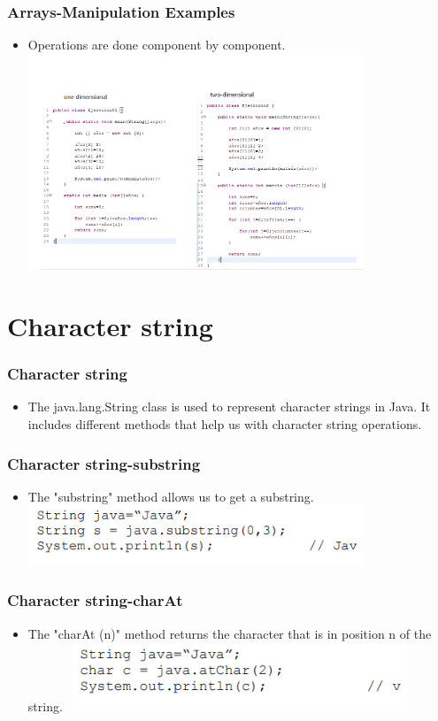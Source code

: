 \documentclass[11pt]{beamer}
\begin{document}
\begin{frame}
\frametitle{Arrays-Manipulation Examples}
\begin{itemize}
\item Operations are done component by component.
{\includegraphics[width=10.0cm]{img/Examples.png}}
\end{itemize}
\end{frame}

\section{Character string}

\begin{frame}
\frametitle{Character string}
\begin{itemize}
\item The java.lang.String class is used to represent character strings in Java. It includes different methods that help us with character string operations.

\end{itemize}
\end{frame}

\begin{frame}
\frametitle{Character string-substring}
\begin{itemize}
\item The "substring" method allows us to get a substring.
\
{\includegraphics[width=10.0cm]{img/a1.png}}
\end{itemize}
\end{frame}

\begin{frame}
\frametitle{Character string-charAt}
\begin{itemize}
\item The "charAt (n)" method returns the character that is in position n of the string.
\
{\includegraphics[width=10.0cm]{img/a2.png}}
\end{itemize}
\end{frame}
\end{document}
